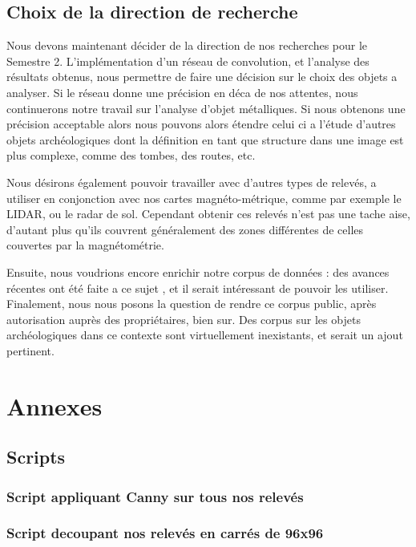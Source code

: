 \documentclass[a4paper, 12pt, titlepage, oneside, french]{article}
\begin{document}
	\subsection{Choix de la direction de recherche}
	Nous devons maintenant décider de la direction de nos recherches pour le Semestre 2. L'implémentation d'un réseau de convolution, et l'analyse des résultats obtenus, nous permettre de faire une décision sur le choix des objets a analyser. Si le réseau donne une précision en déca de nos attentes, nous continuerons notre travail sur l'analyse d'objet métalliques. Si nous obtenons une précision acceptable alors nous pouvons alors étendre celui ci a l'étude d'autres objets archéologiques dont la définition en tant que structure dans une image est plus complexe, comme des tombes, des routes, etc. 

	Nous désirons également pouvoir travailler avec d'autres types de relevés, a utiliser en conjonction avec nos cartes magnéto-métrique, comme par exemple le LIDAR, ou le radar de sol. Cependant obtenir ces relevés n'est pas une tache aise, d'autant plus qu'ils couvrent généralement des zones différentes de celles couvertes par la magnétométrie.

	Ensuite, nous voudrions encore enrichir notre corpus de données : des avances récentes ont été faite a ce sujet \cite{Transfo}, et il serait intéressant de pouvoir les utiliser. Finalement, nous nous posons la question de rendre ce corpus public, après autorisation auprès des propriétaires, bien sur. Des corpus sur les objets archéologiques dans ce contexte sont virtuellement inexistants, et serait un ajout pertinent. 
\newpage
\section{Annexes}




\subsection{Scripts}
\subsubsection{Script appliquant Canny sur tous nos relevés}


\newpage

\subsubsection{Script decoupant nos relevés en carrés de 96x96}


\medskip
\newpage
\printbibliography[heading=bibintoc]
\end{document}
